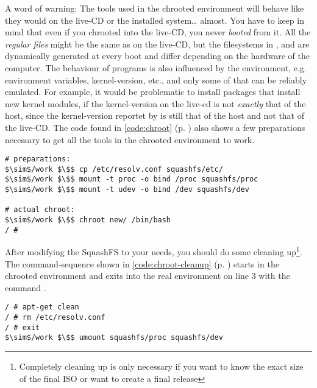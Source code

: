 A word of warning: The tools used in the chrooted environment will behave
like they would on the live-CD or the installed system\ldots{} almost. You have
to keep in mind that even if you chrooted into the live-CD, you never
\emph{booted} from it. All the \emph{regular files} might be the same as on the
live-CD, but the filesystems in ,  and  are
dynamically generated at every boot and differ depending on the hardware of the
computer. The behaviour of programs is also influenced by the environment, e.g.
environment variables, kernel-version, etc., and only some of that can be
reliably emulated. For example, it would be problematic to install packages that
install new kernel modules, if the kernel-version on the live-cd is not
\emph{exactly} that of the host, since the kernel-version reportet by
 is still that of the host and not that of the live-CD.
The code found in \lstlistingname{} \ref{code:chroot} (p. 
\pageref{code:chroot}) also shows a few preparations necessary to get all the
tools in the chrooted environment to work.\\

\begin{lstlisting}[caption={Chrooting into the SquashFS filesystem},float=ht, %
label=code:chroot]
# preparations:
$\sim$/work $\$$ cp /etc/resolv.conf squashfs/etc/
$\sim$/work $\$$ mount -t proc -o bind /proc squashfs/proc
$\sim$/work $\$$ mount -t udev -o bind /dev squashfs/dev

# actual chroot:
$\sim$/work $\$$ chroot new/ /bin/bash
/ # 
\end{lstlisting}

After modifying the SquashFS to your needs, you should do some
cleaning up\footnote{Completely cleaning up is only necessary if you want to know
the exact size of the final ISO or want to create a final release}. The
command-sequence shown in \lstlistingname{} \ref{code:chroot-cleanup} (p.
\pageref{code:chroot-cleanup}) starts in the chrooted environment and exits into
the real environment on line 3 with the command .
\begin{lstlisting}[caption={Cleanup the SquashFS},float=ht,%
	label={code:chroot-cleanup}]
/ # apt-get clean
/ # rm /etc/resolv.conf
/ # exit
$\sim$/work $\$$ umount squashfs/proc squashfs/dev
\end{lstlisting}

